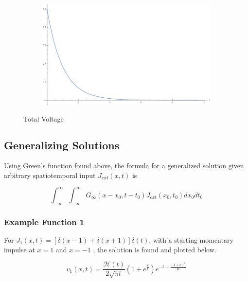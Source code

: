 \documentclass[12pt]{article}
\begin{document}
\begin{figure}[H]
	\centering
	\begin{subfigure}[h]{0.8\textwidth}
        \includegraphics[width=\textwidth]{Part1Plots/g}
    \end{subfigure}
    \caption{Total Voltage} \label{fig:totalvoltage}
\end{figure}
   	
   	
\subsection{Generalizing Solutions}
Using Green's function found above, the formula for a generalized solution given arbitrary spatiotemporal input $J_{ext}(x,t)$ is

$$ \int_{-\infty}^{\infty}\int_{-\infty}^{\infty}G_{\infty}(x-x_0,t-t_0)J_{ext}(x_0,t_0)dx_0dt_0 $$

\pagebreak

\subsubsection{Example Function 1}
For $J_{1}(x,t) = [\delta(x-1)+\delta(x+1)]\delta(t)$, with a starting momentary impulse at $x=1$ and $x=-1$ , the solution is found and plotted below.

$$ v_1(x,t) = \frac{\mathcal{H}(t)}{2\sqrt{\pi t}}(1+e^{\frac{x}{t}})e^{-t-\frac{(1+x)^2}{4t}} $$
\end{document}
